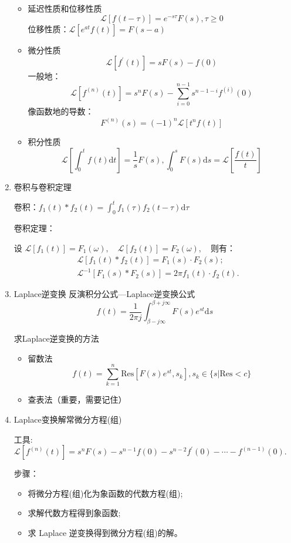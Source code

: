 \documentclass[a4paper,11pt,UTF8]{article}
\begin{document}
\begin{enumerate}
\begin{itemize}
		\item 延迟性质和位移性质
		$$
		\mathcal{L}[f(t-\tau)]=e^{-s\tau}F(s),\tau\geq0
		$$
		位移性质：$\mathcal{L}[e^{at}f(t)]=F(s-a)$
		
		\item 微分性质
		$$
		\mathcal{L}[f^\prime(t)]=sF(s)-f(0)
		$$
		一般地：
		$$
		\mathcal{L}[f^{(n)}(t)]=s^nF(s)-\sum_{i=0}^{n-1}s^{n-1-i}f^{(i)}(0)
		$$
		像函数地的导数：
		$$
		F^{(n)}(s)=(-1)^n\mathcal{L}[t^nf(t)]
		$$
		
		\item 积分性质
		$$
		\mathcal{L}[\int_{0}^tf(t)\mathrm{d}t]=\frac1sF(s),\int_{0}^sF(s)\mathrm{d}s=\mathcal{L}[\frac{f(t)}{t}]
		$$
	\end{itemize}
	\item 卷积与卷积定理
	
	卷积：$\displaystyle f_1(t)*f_2(t)=\int_0^tf_1(\tau)f_2(t-\tau)\mathrm{d}\tau$
	
	卷积定理：
	
	设 $\mathcal{L}[f_1(t)]{=}F_1(\omega),\quad\mathcal{L}[f_2(t)]{=}F_2(\omega),\quad $则有：
	$$
	\begin{aligned}
		&\mathcal{L}[f_1(t)*f_2(t)]=F_1(s)\cdotp F_2(s);\\
		&\mathcal{L}^{-1}[F_1(s)*F_2(s)]=2\pi f_1(t)\cdotp f_2(t).
	\end{aligned}
	$$
	\item Laplace逆变换
	反演积分公式—Laplace逆变换公式
	$$
	f(t)=\frac1{2\pi j}\int_{\beta-j\infty}^{\beta+j\infty}F(s)e^{st}\mathrm{d}s
	$$
	
	求Laplace逆变换的方法
	\begin{itemize}
		\item 留数法
		$$
		f(t)=\sum_{k=1}^n\mathrm{Res}[F(s)e^{st},s_k],s_k\in\{s|\mathrm{Res}<c\}
		$$

		\item 查表法（重要，需要记住）
	\end{itemize}
	\item Laplace变换解常微分方程(组)
	
	工具: $\mathscr{L}[f^{(n)}(t)]=s^nF(s)-s^{n-1}f(0)-s^{n-2}f^{\prime}(0)-\cdots-f^{(n-1)}(0).$
	
	步骤：
	\begin{itemize}
		\item 将微分方程(组)化为象函数的代数方程(组);
		\item 求解代数方程得到象函数;
		\item 求 Laplace 逆变换得到微分方程(组)的解。
		
	\end{itemize}
\end{enumerate}
\end{document}
